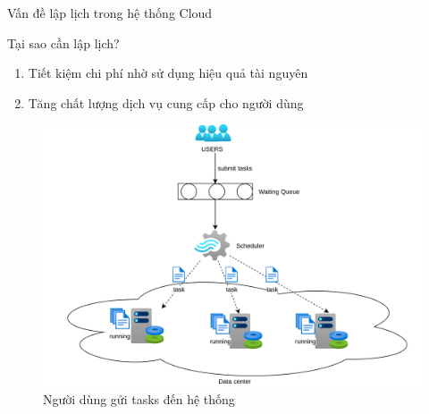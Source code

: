 \documentclass[11pt,xcolor={dvipsnames}, aspectratio=169]{beamer}
\begin{document}
\begin{frame}
{Vấn đề lập lịch trong hệ thống Cloud}
\begin{minipage}[t]{0.48\linewidth}
	\vspace{1cm}
	\begin{block}
	{Tại sao cần lập lịch?}
	\begin{enumerate}
		\item Tiết kiệm chi phí nhờ sử dụng hiệu quả tài nguyên 
		\item Tăng chất lượng dịch vụ cung cấp cho người dùng
	\end{enumerate}
	\end{block}
\end{minipage}
\hfill
\begin{minipage}[t]{0.48\linewidth}
	\begin{figure}
		\centering
		\includegraphics[scale=0.4]{images/basic_flow.png}
		\caption{Người dùng gửi tasks đến hệ thống}
	\end{figure}
\end{minipage}
\end{frame}

\end{document}
